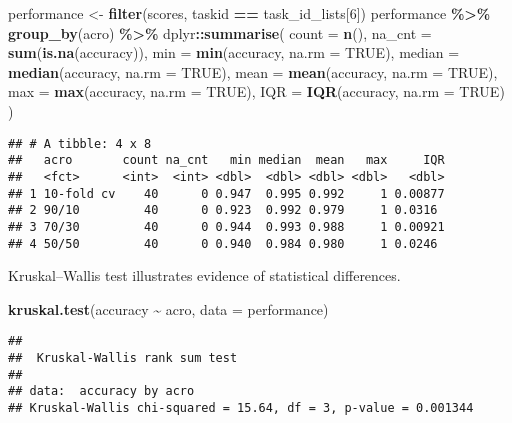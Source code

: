 \documentclass[
]{book}
\newenvironment{Shaded}{\begin{snugshade}}{\end{snugshade}}
\newcommand{\AttributeTok}[1]{\textcolor[rgb]{0.13,0.29,0.53}{#1}}
\newcommand{\ConstantTok}[1]{\textcolor[rgb]{0.56,0.35,0.01}{#1}}
\newcommand{\DecValTok}[1]{\textcolor[rgb]{0.00,0.00,0.81}{#1}}
\newcommand{\FunctionTok}[1]{\textcolor[rgb]{0.13,0.29,0.53}{\textbf{#1}}}
\newcommand{\NormalTok}[1]{#1}
\newcommand{\OtherTok}[1]{\textcolor[rgb]{0.56,0.35,0.01}{#1}}
\newcommand{\SpecialCharTok}[1]{\textcolor[rgb]{0.81,0.36,0.00}{\textbf{#1}}}
\begin{document}
\begin{Shaded}
\begin{Highlighting}[]
\NormalTok{performance }\OtherTok{\textless{}{-}} \FunctionTok{filter}\NormalTok{(scores, taskid }\SpecialCharTok{==}\NormalTok{ task\_id\_lists[}\DecValTok{6}\NormalTok{])}
\NormalTok{performance }\SpecialCharTok{\%\textgreater{}\%}
  \FunctionTok{group\_by}\NormalTok{(acro) }\SpecialCharTok{\%\textgreater{}\%}
\NormalTok{  dplyr}\SpecialCharTok{::}\FunctionTok{summarise}\NormalTok{(}
    \AttributeTok{count =} \FunctionTok{n}\NormalTok{(),}
    \AttributeTok{na\_cnt =} \FunctionTok{sum}\NormalTok{(}\FunctionTok{is.na}\NormalTok{(accuracy)),}
    \AttributeTok{min =} \FunctionTok{min}\NormalTok{(accuracy, }\AttributeTok{na.rm =} \ConstantTok{TRUE}\NormalTok{),}
    \AttributeTok{median =} \FunctionTok{median}\NormalTok{(accuracy, }\AttributeTok{na.rm =} \ConstantTok{TRUE}\NormalTok{),}
    \AttributeTok{mean =} \FunctionTok{mean}\NormalTok{(accuracy, }\AttributeTok{na.rm =} \ConstantTok{TRUE}\NormalTok{),}
    \AttributeTok{max =} \FunctionTok{max}\NormalTok{(accuracy, }\AttributeTok{na.rm =} \ConstantTok{TRUE}\NormalTok{),}
    \AttributeTok{IQR =} \FunctionTok{IQR}\NormalTok{(accuracy, }\AttributeTok{na.rm =} \ConstantTok{TRUE}\NormalTok{)}
\NormalTok{  )}
\end{Highlighting}
\end{Shaded}

\begin{verbatim}
## # A tibble: 4 x 8
##   acro       count na_cnt   min median  mean   max     IQR
##   <fct>      <int>  <int> <dbl>  <dbl> <dbl> <dbl>   <dbl>
## 1 10-fold cv    40      0 0.947  0.995 0.992     1 0.00877
## 2 90/10         40      0 0.923  0.992 0.979     1 0.0316 
## 3 70/30         40      0 0.944  0.993 0.988     1 0.00921
## 4 50/50         40      0 0.940  0.984 0.980     1 0.0246
\end{verbatim}

Kruskal--Wallis test illustrates evidence of statistical differences.

\begin{Shaded}
\begin{Highlighting}[]
\FunctionTok{kruskal.test}\NormalTok{(accuracy }\SpecialCharTok{\textasciitilde{}}\NormalTok{ acro, }\AttributeTok{data =}\NormalTok{ performance)}
\end{Highlighting}
\end{Shaded}

\begin{verbatim}
## 
##  Kruskal-Wallis rank sum test
## 
## data:  accuracy by acro
## Kruskal-Wallis chi-squared = 15.64, df = 3, p-value = 0.001344
\end{verbatim}
\end{document}
